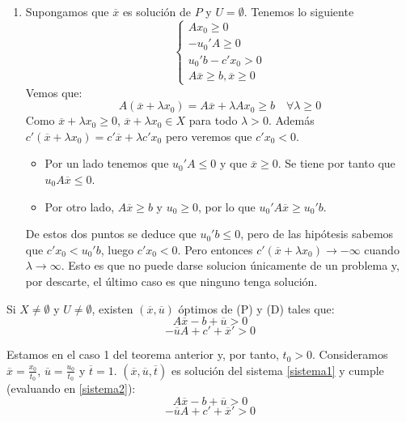 \documentclass[PM.tex]{subfiles}
\begin{document}
\begin{dem}
\begin{enumerate}
\begin{enumerate}
	\item Supongamos que $\overline{x}$ es solución de $P$ y $U = \emptyset$. Tenemos lo siguiente
	\[ \begin{cases}Ax_0 \geq 0 \\ -u_0'A ≥ 0 \\ u_0'b-c'x_0 > 0 \\  A\overline{x} ≥ b,\overline{x}≥ 0\end{cases} \]
	Vemos que:
	\[ A(\overline{x} + λx_0) = A\overline{x} + λ A x_0 ≥ b \quad \forall λ\geq 0\]
	Como $\overline{x} + λ x_0 ≥ 0$, $\overline{x} + λ x_0 \in X$ para todo $λ > 0$. Además $c'(\overline{x} + λ x_0) = c'\overline{x} + λ c' x_0$ pero veremos que $c'x_0 < 0$.
	\begin{itemize}
	\item Por un lado tenemos que  $u_0'A ≤ 0$ y que $\overline{x} ≥ 0$. Se tiene por tanto que $u_0 A\overline{x} \leq 0$.
	\item Por otro lado, $A \overline{x}\geq b$ y $u_0 \geq 0$, por lo que $u_0'A\overline{x} \geq u_0'b$.
	\end{itemize}
	De estos dos puntos se deduce que $u_0'b\leq 0$, pero de las hipótesis sabemos que $c'x_0 < u_0'b$, luego $c'x_0 <0$. Pero entonces $c'(\overline{x} + λ x_0) \to -\infty$ cuando $λ \to \infty$. Esto es que no puede darse solucion únicamente de un problema y, por descarte, el último caso es que ninguno tenga solución.
	\end{enumerate}
\end{enumerate}
\end{dem}

\begin{theorem}
Si $X \neq \emptyset$ y $U \neq \emptyset$, existen $(\overline{x},\overline{u})$ óptimos de (P) y (D) tales que:
\[ A\overline{x} -b + \overline{u} > 0\]
\[ -\overline{u}A + c' +\overline{x}' > 0\]
\end{theorem}

\begin{dem}
Estamos en el caso 1 del teorema anterior y, por tanto, $t_0 > 0$. Consideramos $\overline{x} = \frac{x_0}{t_0}$, $\overline{u}=\frac{u_0}{t_0}$ y $\overline{t} = 1$. $(\overline{x},\overline{u},\overline{t})$ es solución del sistema \eqref{sistema1} y cumple (evaluando en \eqref{sistema2}):
\[ A\overline{x} -b + \overline{u} > 0\]
\[ -\overline{u}A + c' +\overline{x}' > 0\]
\end{dem}
\end{document}
